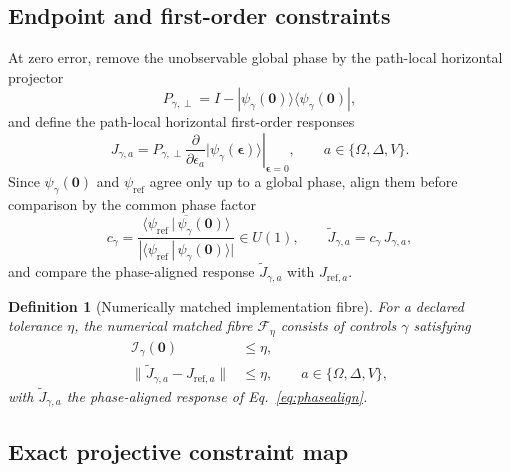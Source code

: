 \documentclass[11pt]{article}
\newtheorem{definition}{Definition}
\newcommand{\cF}{\mathcal{F}}
\newcommand{\cI}{\mathcal{I}}
\begin{document}
\subsection{Endpoint and first-order constraints}

At zero error, remove the unobservable global phase by the path-local horizontal projector
\[
P_{\gamma,\perp}
=
I-|\psi_\gamma(\mathbf{0})\rangle\langle\psi_\gamma(\mathbf{0})|,
\]
and define the path-local horizontal first-order responses
\begin{equation}
J_{\gamma,a}
=
P_{\gamma,\perp}
\left.
\frac{\partial}{\partial\epsilon_a}
|\psi_\gamma(\boldsymbol{\epsilon})\rangle
\right|_{\boldsymbol{\epsilon}=0},
\qquad
a\in\{\Omega,\Delta,V\}.
\label{eq:tangents}
\end{equation}
Since $\psi_\gamma(\mathbf{0})$ and $\psi_{\mathrm{ref}}$ agree only up to a global phase, align them before comparison by the common phase factor
\begin{equation}
c_\gamma
=
\frac{\overline{\langle\psi_{\mathrm{ref}}\,|\,\psi_\gamma(\mathbf{0})\rangle}}
{|\langle\psi_{\mathrm{ref}}\,|\,\psi_\gamma(\mathbf{0})\rangle|}
\in U(1),
\qquad
\widetilde J_{\gamma,a}=c_\gamma\,J_{\gamma,a},
\label{eq:phasealign}
\end{equation}
and compare the phase-aligned response $\widetilde J_{\gamma,a}$ with $J_{\mathrm{ref},a}$.

\begin{definition}[Numerically matched implementation fibre]
For a declared tolerance $\eta$, the numerical matched fibre
$\cF_\eta$ consists of controls $\gamma$ satisfying
\begin{align}
\cI_\gamma(\mathbf{0})&\le\eta,
\nonumber\\
\|\widetilde J_{\gamma,a}-J_{\mathrm{ref},a}\|&\le\eta,
\qquad a\in\{\Omega,\Delta,V\},
\label{eq:fibre}
\end{align}
with $\widetilde J_{\gamma,a}$ the phase-aligned response of Eq.~\eqref{eq:phasealign}.
\end{definition}

\subsection{Exact projective constraint map}
\label{sec:projchart}
\end{document}
